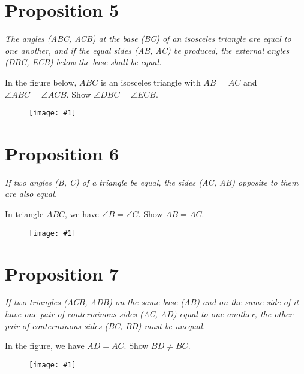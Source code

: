 \documentclass[openany]{book}
\newcommand{\diagram}[1]{
    \vspace*{\fill}
    \begin{figure}[H]
        \centering
        \texttt{[image: \#1]}
    \end{figure}
    \vspace*{\fill}
}
\newenvironment{proposition}
    {\begin{center}\em}
    {\end{center}}
\begin{document}
    \clearpage
    \section{Proposition 5}
    \begin{proposition}
    The angles (ABC, ACB) at the base (BC) of an isosceles triangle
    are equal to one another, and if the equal sides (AB, AC) be produced, the
    external angles (DBC, ECB) below the base shall be equal.
    \end{proposition}
        In the figure below, $ABC$ is an isosceles triangle with $AB$ = $AC$ and $\angle{ABC} = \angle{ACB}$. Show $\angle{DBC} = \angle{ECB}$.
    \diagram{prop5.pdf}


    \clearpage
    \section{Proposition 6}
    \begin{proposition}
    If two angles (B, C) of a triangle be equal, the sides (AC, AB) opposite to them are also equal.
    \end{proposition}
    In triangle $ABC$, we have $\angle{B} = \angle{C}$. Show $AB = AC$.
    \diagram{prop6.pdf}


    \clearpage
    \section{Proposition 7}
    \begin{proposition}
    If two triangles (ACB, ADB) on the same base (AB) and on the same side of it have one pair of conterminous sides (AC, AD) equal to one another, the other pair of conterminous sides (BC, BD) must be unequal.
    \end{proposition}
    In the figure, we have $AD = AC$. Show $BD \neq BC$.
    \diagram{prop7.pdf}


    \clearpage
\end{document}
